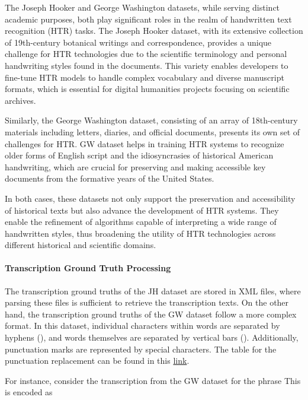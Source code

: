 The Joseph Hooker and George Washington datasets, while serving distinct academic purposes, both play significant roles in the realm of handwritten text recognition (HTR) tasks. The Joseph Hooker dataset, with its extensive collection of 19th-century botanical writings and correspondence, provides a unique challenge for HTR technologies due to the scientific terminology and personal handwriting styles found in the documents. This variety enables developers to fine-tune HTR models to handle complex vocabulary and diverse manuscript formats, which is essential for digital humanities projects focusing on scientific archives.

Similarly, the George Washington dataset, consisting of an array of 18th-century materials including letters, diaries, and official documents, presents its own set of challenges for HTR. GW dataset helps in training HTR systems to recognize older forms of English script and the idiosyncrasies of historical American handwriting, which are crucial for preserving and making accessible key documents from the formative years of the United States.

In both cases, these datasets not only support the preservation and accessibility of historical texts but also advance the development of HTR systems. They enable the refinement of algorithms capable of interpreting a wide range of handwritten styles, thus broadening the utility of HTR technologies across different historical and scientific domains.

\paragraph*{Transcription Ground Truth Processing}
\label{par:3_transcription_gound_truth_processing}
The transcription ground truths of the JH dataset are stored in XML files, where parsing these files is sufficient to retrieve the transcription texts. On the other hand, the transcription ground truths of the GW dataset follow a more complex format. In this dataset, individual characters within words are separated by hyphens (\say{ - }), and words themselves are separated by vertical bars (\say{ \textbar \;}). Additionally, punctuation marks are represented by special characters. The table for the punctuation replacement can be found in this \href{https://github.com/Yung-Hsin-Chen/master_thesis/blob/src/model/config/punctuation_list.json}{link}. 

For instance, consider the transcription from the GW dataset for the phrase  This is encoded as 


